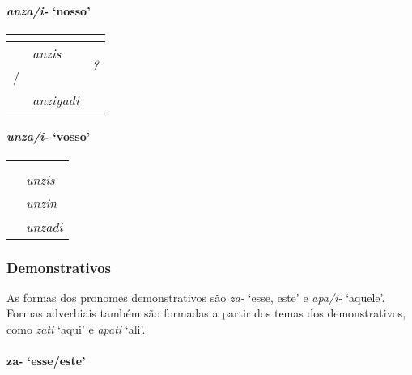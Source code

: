 \paragraph{\emph{anza/i-} `nosso'}

\begin{center}
	\begin{tabular}[c]{lll}
		\toprule
		                      & \Sg{}\emph{}    & \Pl{}\emph{}                \\
		\midrule
		\Nom{} \Com{}         & \emph{anzis}    & \multirow{2}{4em}{\emph{?}} \\
		\Nom{}/\Acu{} \Neut{} & \emph{}         & \emph{anzaya}               \\
		\Abl{}                & \emph{anziyadi} & \emph{}                     \\
		\bottomrule
	\end{tabular}
\end{center}


\paragraph{\emph{unza/i-} `vosso'}

\begin{center}
	\begin{tabular}[c]{ll}
		\toprule
		              & \Sg{}\emph{}  \\
		\midrule
		\Nom{} \Com{} & \emph{unzis}  \\
		\Acu{} \Com{} & \emph{unzin}  \\
		\Abl{}        & \emph{unzadi} \\
		\bottomrule
	\end{tabular}
\end{center}

\subsubsection{Demonstrativos}
As formas dos pronomes demonstrativos são \emph{za-} `esse, este' e
\emph{apa\slash{}i-} `aquele'.
Formas adverbiais também são formadas a partir dos temas dos demonstrativos,
como \emph{zati} `aqui' e \emph{apati} `ali'.

\paragraph{za- `esse/este'}

